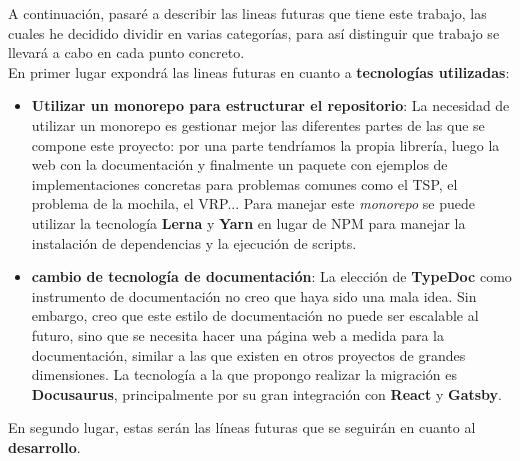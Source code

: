 A continuación, pasaré a describir las lineas futuras que tiene este trabajo, las cuales he decidido dividir en varias categorías, para así distinguir que trabajo se llevará a cabo en cada punto concreto. \\

En primer lugar expondrá las lineas futuras en cuanto a \textbf{tecnologías utilizadas}:

\begin{itemize}
    \item \textbf{Utilizar un monorepo para estructurar el repositorio}: La necesidad de utilizar un monorepo es gestionar mejor las diferentes partes de las que se compone este proyecto: por una parte tendríamos la propia librería, luego la web con la documentación y finalmente un paquete con ejemplos de implementaciones concretas para problemas comunes como el TSP, el problema de la mochila, el VRP... Para manejar este \textit{monorepo} se puede utilizar la tecnología \textbf{Lerna} y \textbf{Yarn} en lugar de NPM para manejar la instalación de dependencias y la ejecución de scripts.
    \item \textbf{cambio de tecnología de documentación}: La elección de \textbf{TypeDoc} como instrumento de documentación no creo que haya sido una mala idea. Sin embargo, creo que este estilo de documentación no puede ser escalable al futuro, sino que se necesita hacer una página web a medida para la documentación, similar a las que existen en otros proyectos de grandes dimensiones. La tecnología a la que propongo realizar la migración es \textbf{Docusaurus}, principalmente por su gran integración con \textbf{React} y \textbf{Gatsby}.
\end{itemize}

En segundo lugar, estas serán las líneas futuras que se seguirán en cuanto al \textbf{desarrollo}.

